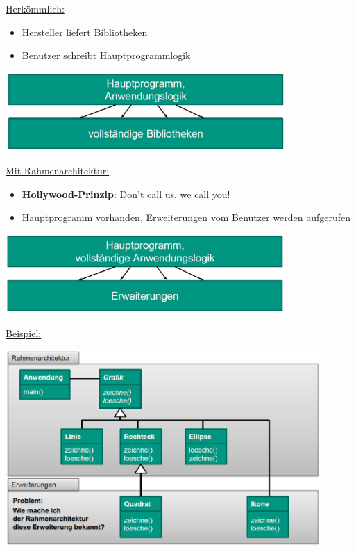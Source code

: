 \documentclass[parskip=full, 12pt]{scrartcl}
\begin{document}
				\underline{Herkömmlich:}
				\begin{itemize}
					\item Hersteller liefert Bibliotheken
					\item Benutzer schreibt Hauptprogrammlogik
				\end{itemize}
			
				\begin{center}
					\includegraphics[width=0.8\textwidth]{../images/rahmenarchitekturHerkoemmlich.png}
				\end{center}
				
				\underline{Mit Rahmenarchitektur:}
				\begin{itemize}
					\item \textbf{Hollywood-Prinzip}: Don't call us, we call you!
					\item Hauptprogramm vorhanden, Erweiterungen vom Benutzer werden aufgerufen
				\end{itemize}
	
				\begin{center}
					\includegraphics[width=0.8\textwidth]{../images/rahmenarchitektur.png}
				\end{center}
	
				\newpage
				\underline{Beispiel:}
				
				\begin{center}
					\includegraphics[width=0.9\textwidth]{../images/rahmenarchitekturBeispiel.png}
				\end{center}
	
\end{document}
